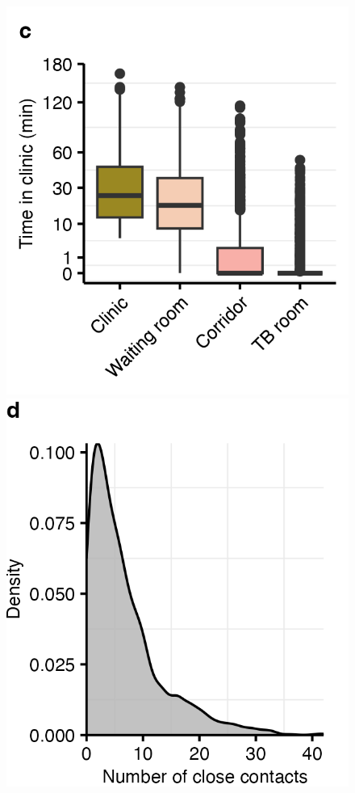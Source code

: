 \documentclass[fleqn,11pt]{wlscirep}
\begin{document}
\begin{figure}
    \includegraphics{results/data/time-in-clinic.png}
    \includegraphics{results/data/number-close-contacts.png}

\end{figure}
\end{document}
